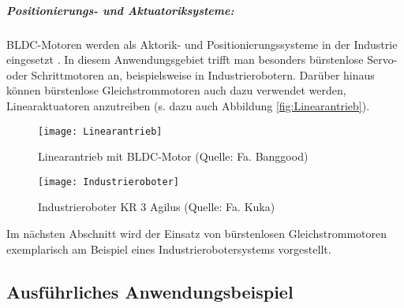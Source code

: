 \subparagraph{Positionierungs- und Aktuatoriksysteme:} BLDC-Motoren werden als Aktorik- und Positionierungssysteme in der Industrie eingesetzt \parencite[S.159]{Gopal2002}. In diesem Anwendungsgebiet trifft man besonders bürstenlose Servo- oder Schrittmotoren an, beispielsweise in Industrierobotern. Darüber hinaus können bürstenlose Gleichstrommotoren auch dazu verwendet werden, Linearaktuatoren anzutreiben \parencite[S.91]{Zhang2013} (s. dazu auch Abbildung \ref{fig:Linearantrieb}).

\begin{figure}[h]
  \begin{minipage}{.49\textwidth}
    \centering
    \texttt{[image: Linearantrieb]}
    \caption[Linearantrieb mit BLDC-Motor]{Linearantrieb mit BLDC-Motor (Quelle: Fa. Banggood)}
    \label{fig:Linearantrieb}
  \end{minipage}\hfill%
  \begin{minipage}{.49\textwidth}
    \centering
    \texttt{[image: Industrieroboter]}
    \caption[Industrieroboter KR 3 Agilus]{Industrieroboter KR 3 Agilus (Quelle: Fa. Kuka)}
    \label{fig:Industrieroboter}
  \end{minipage}
\end{figure}

Im nächsten Abschnitt wird der Einsatz von bürstenlosen Gleichstrommotoren exemplarisch am Beispiel eines Industrierobotersystems vorgestellt.

\subsection{Ausführliches Anwendungsbeispiel}

